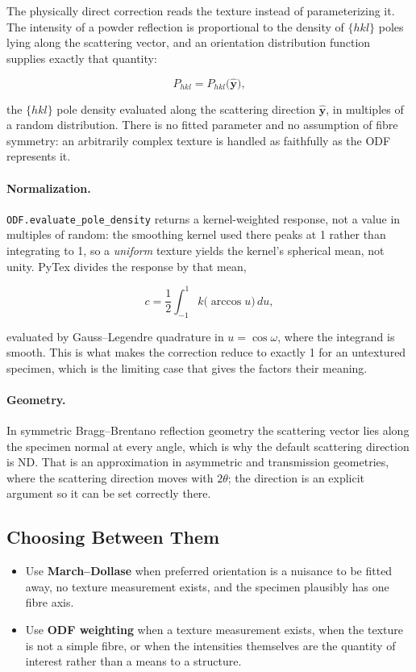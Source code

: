 The physically direct correction reads the texture instead of parameterizing it.
The intensity of a powder reflection is proportional to the density of $\{hkl\}$
poles lying along the scattering vector, and an orientation distribution
function supplies exactly that quantity:

\[
  P_{hkl} = P_{hkl}\bigl(\hat{\mathbf{y}}\bigr),
\]

the $\{hkl\}$ pole density evaluated along the scattering direction
$\hat{\mathbf{y}}$, in multiples of a random distribution. There is no fitted
parameter and no assumption of fibre symmetry: an arbitrarily complex texture is
handled as faithfully as the ODF represents it.

\paragraph{Normalization.}
\texttt{ODF.evaluate\_pole\_density} returns a kernel-weighted response, not a
value in multiples of random: the smoothing kernel used there peaks at 1 rather
than integrating to 1, so a \emph{uniform} texture yields the kernel's spherical
mean, not unity. PyTex divides the response by that mean,

\[
  c = \frac{1}{2}\int_{-1}^{1} k\bigl(\arccos u\bigr)\, du,
\]

evaluated by Gauss--Legendre quadrature in $u = \cos\omega$, where the integrand
is smooth. This is what makes the correction reduce to exactly 1 for an
untextured specimen, which is the limiting case that gives the factors their
meaning.

\paragraph{Geometry.}
In symmetric Bragg--Brentano reflection geometry the scattering vector lies along
the specimen normal at every angle, which is why the default scattering
direction is ND. That is an approximation in asymmetric and transmission
geometries, where the scattering direction moves with $2\theta$; the direction is
an explicit argument so it can be set correctly there.

\subsection{Choosing Between Them}

\begin{itemize}
  \item Use \textbf{March--Dollase} when preferred orientation is a nuisance to
        be fitted away, no texture measurement exists, and the specimen
        plausibly has one fibre axis.
  \item Use \textbf{ODF weighting} when a texture measurement exists, when the
        texture is not a simple fibre, or when the intensities themselves are
        the quantity of interest rather than a means to a structure.
\end{itemize}


